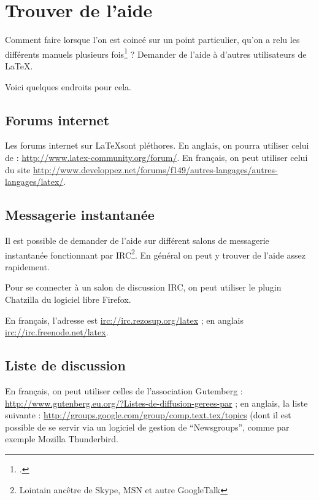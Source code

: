 \chapter{Trouver de l'aide}

\begin{intro}
Comment faire lorsque l'on est coincé sur un point particulier, qu'on a relu les différents manuels plusieurs fois\footcite[Signalons au passage la possibilité de télécharger une aide sur l'ensemble des erreurs de compilation avec \LaTeX][]{erreurscompilo} ? Demander de l'aide à d'autres utilisateurs de \LaTeX{}.

Voici quelques endroits pour cela. 
\end{intro}


\section{Forums internet}

Les forums internet sur \LaTeX sont pléthores. En anglais, on pourra utiliser celui de  : \url{http://www.latex-community.org/forum/}. En français, on peut utiliser celui du site  \url{http://www.developpez.net/forums/f149/autres-langages/autres-langages/latex/}.


\section{Messagerie instantanée}

Il est possible de demander de l'aide sur différent salons de messagerie instantanée fonctionnant par IRC\footnote{Lointain ancêtre de Skype, MSN et autre GoogleTalk}. En général on peut y trouver de l'aide assez rapidement.

Pour se connecter à un salon de discussion IRC, on peut utiliser le plugin Chatzilla du logiciel libre Firefox.

En français, l'adresse est \url{irc://irc.rezosup.org/latex} ; en anglais
\url{irc://irc.freenode.net/latex}.


\section{Liste de discussion}

En français, on peut utiliser celles de l'association Gutemberg : \url{http://www.gutenberg.eu.org/?Listes-de-diffusion-gerees-par} ; en anglais,  la liste suivante : \url{http://groups.google.com/group/comp.text.tex/topics} (dont il est possible de se servir via un logiciel de gestion de \enquote{{Newsgroups}}, comme par exemple Mozilla Thunderbird.
